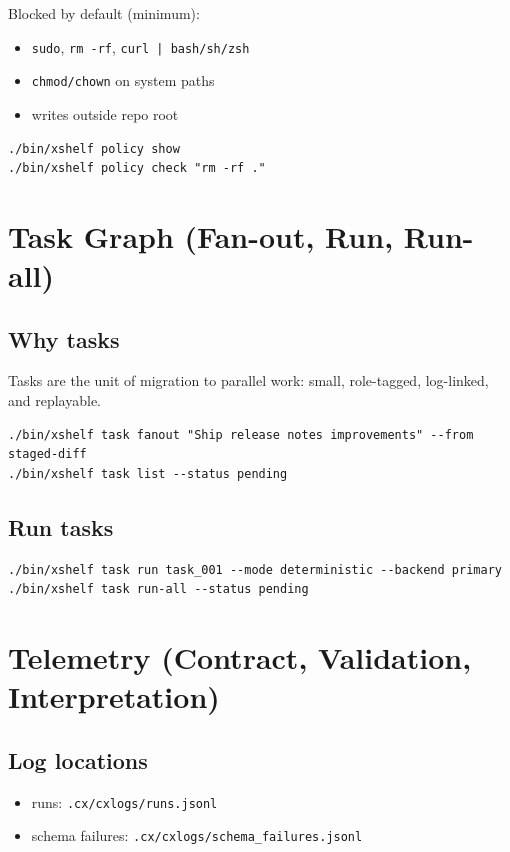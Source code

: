 \documentclass[11pt]{article}
\begin{document}
Blocked by default (minimum):
\begin{itemize}
  \item \texttt{sudo}, \texttt{rm -rf}, \texttt{curl | bash/sh/zsh}
  \item \texttt{chmod/chown} on system paths
  \item writes outside repo root
\end{itemize}

\begin{lstlisting}[style=cx]
./bin/xshelf policy show
./bin/xshelf policy check "rm -rf ."
\end{lstlisting}

\section{Task Graph (Fan-out, Run, Run-all)}
\subsection{Why tasks}
Tasks are the unit of migration to parallel work: small, role-tagged, log-linked, and replayable.

\begin{lstlisting}[style=cx]
./bin/xshelf task fanout "Ship release notes improvements" --from staged-diff
./bin/xshelf task list --status pending
\end{lstlisting}

\subsection{Run tasks}
\begin{lstlisting}[style=cx]
./bin/xshelf task run task_001 --mode deterministic --backend primary
./bin/xshelf task run-all --status pending
\end{lstlisting}

\section{Telemetry (Contract, Validation, Interpretation)}
\subsection{Log locations}
\begin{itemize}
  \item runs: \texttt{.cx/cxlogs/runs.jsonl}
  \item schema failures: \texttt{.cx/cxlogs/schema\_failures.jsonl}
\end{itemize}
\end{document}
